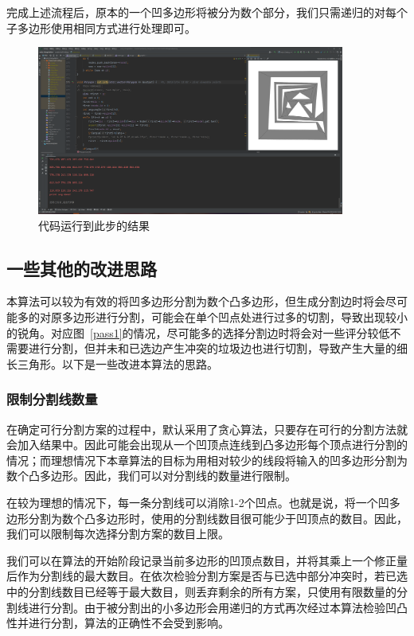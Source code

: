 完成上述流程后，原本的一个凹多边形将被分为数个部分，我们只需递归的对每个子多边形使用相同方式进行处理即可。

\begin{figure}[htp]
    \centering
    \includegraphics[width=0.9\textwidth]
    {figures/output.png}
    \caption{代码运行到此步的结果}
  \end{figure}

\subsection{一些其他的改进思路}
本算法可以较为有效的将凹多边形分割为数个凸多边形，但生成分割边时将会尽可能多的对原多边形进行分割，可能会在单个凹点处进行过多的切割，导致出现较小的锐角。对应图~\ref*{pass1}的情况，尽可能多的选择分割边时将会对一些评分较低不需要进行分割，但并未和已选边产生冲突的垃圾边也进行切割，导致产生大量的细长三角形。以下是一些改进本算法的思路。

\subsubsection{限制分割线数量}\label{sec:limit}
在确定可行分割方案的过程中，默认采用了贪心算法，只要存在可行的分割方法就会加入结果中。因此可能会出现从一个凹顶点连线到凸多边形每个顶点进行分割的情况；而理想情况下本章算法的目标为用相对较少的线段将输入的凹多边形分割为数个凸多边形。因此，我们可以对分割线的数量进行限制。

在较为理想的情况下，每一条分割线可以消除1-2个凹点。也就是说，将一个凹多边形分割为数个凸多边形时，使用的分割线数目很可能少于凹顶点的数目。因此，我们可以限制每次选择分割方案的数目上限。

我们可以在算法的开始阶段记录当前多边形的凹顶点数目，并将其乘上一个修正量后作为分割线的最大数目。在依次检验分割方案是否与已选中部分冲突时，若已选中的分割线数目已经等于最大数目，则丢弃剩余的所有方案，只使用有限数量的分割线进行分割。由于被分割出的小多边形会用递归的方式再次经过本算法检验凹凸性并进行分割，算法的正确性不会受到影响。

